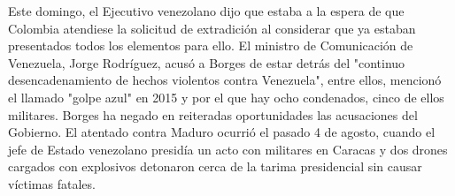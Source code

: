 \documentclass{article}%
\begin{document}
\newline%
%
Este domingo, el Ejecutivo venezolano dijo que estaba a la espera de que Colombia atendiese la solicitud de extradición al considerar que ya estaban presentados todos los elementos para ello.%
\newline%
%
El ministro de Comunicación de Venezuela, Jorge Rodríguez, acusó a Borges de estar detrás del "continuo desencadenamiento de hechos violentos contra Venezuela", entre ellos, mencionó el llamado "golpe azul" en 2015 y por el que hay ocho condenados, cinco de ellos militares.%
\newline%
%
Borges ha negado en reiteradas oportunidades las acusaciones del Gobierno.\newline%
\newline%
El atentado contra Maduro ocurrió el pasado 4 de agosto, cuando el jefe de Estado venezolano presidía un acto con militares en Caracas y dos drones cargados con explosivos detonaron cerca de la tarima presidencial sin causar víctimas fatales.%
\newline%
%
\end{document}
